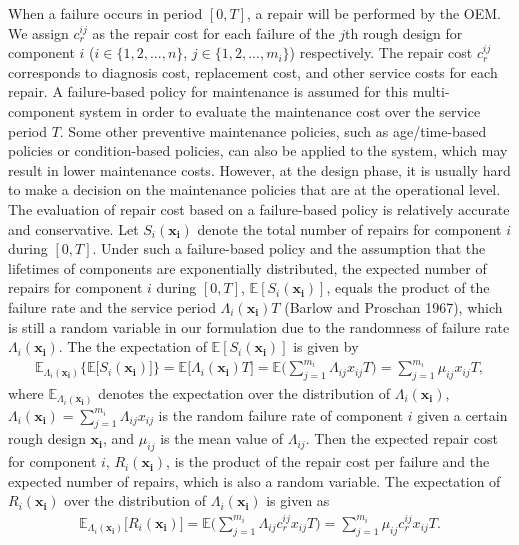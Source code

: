 \documentclass[preprint,12pt]{elsarticle}
\begin{document}
When a failure occurs in period $[0, T]$, a repair will be performed by the OEM. We assign $c_r^{ij}$ as the repair cost for each failure of the $j$th rough design for component $i$ ($i \in \{1,2,...,n\}$, $j \in \{1,2,...,m_i\}$) respectively. The repair cost $c_r^{ij}$ corresponds to diagnosis cost, replacement cost, and other service costs for each repair. A failure-based policy for maintenance is assumed for this multi-component system in order to evaluate the maintenance cost over the service period $T$. Some other preventive maintenance policies, such as age/time-based policies or condition-based policies, can also be applied to the system, which may result in lower maintenance costs. However, at the design phase, it is usually hard to make a decision on the maintenance policies that are at the operational level. The evaluation of repair cost based on a failure-based policy is relatively accurate and conservative. Let $S_{i}(\boldsymbol{x_{i}})$ denote the total number of repairs for component $i$ during $[0,T]$. Under such a failure-based policy and the assumption that the lifetimes of components are exponentially distributed, the expected number of repairs for component $i$ during $[0,T]$, $\mathbb{E}[S_{i}(\boldsymbol{x_{i}})]$, equals the product of the failure rate and the service period $\Lambda_i(\boldsymbol{x_{i}}) T$ (Barlow and Proschan 1967), which is still a random variable in our formulation due to the randomness of failure rate $\Lambda_{i}(\boldsymbol{x_{i}})$. The the expectation of $\mathbb{E}[S_{i}(\boldsymbol{x_{i}})]$ is given by
\begin {eqnarray}
\mathbb{E}_{\Lambda_{i}(\boldsymbol{x_{i}})} \bigg\{ \mathbb{E}\bigg[S_{i}(\boldsymbol{x_{i}})\bigg] \bigg\}=\mathbb{E}\bigg[\Lambda_{i}(\boldsymbol{x_{i}})T\bigg] =\mathbb{E}\bigg(\sum_{j=1}^{m_{i}}{\Lambda_{ij}x_{ij}}T\bigg)=\sum_{j=1}^{m_{i}}{\mu_{ij}x_{ij}}T,
\end {eqnarray}
where $\mathbb{E}_{\Lambda_{i}(\boldsymbol{x_{i}})}$ denotes the expectation over the distribution of $\Lambda_{i}(\boldsymbol{x_{i}})$, $\Lambda_{i}(\boldsymbol{x_{i}})=\sum_{j=1}^{m_{i}}{\Lambda_{ij}x_{ij}}$ is the random failure rate of component $i$ given a certain rough design $\boldsymbol{x_i}$, and $\mu_{ij}$ is the mean value of $\Lambda_{ij}$. Then the expected repair cost for component $i$, $R_{i}(\boldsymbol{x_{i}})$, is the product of the repair cost per failure and the expected number of repairs, which is also a random variable. The expectation of $R_{i}(\boldsymbol{x_{i}})$ over the distribution of $\Lambda_i(\boldsymbol{x_{i}})$ is given as
\begin {eqnarray}
\mathbb{E}_{\Lambda_{i}(\boldsymbol{x_{i}})} \bigg[ R_{i}(\boldsymbol{x_{i}}) \bigg]=\mathbb{E}\bigg(\sum_{j=1}^{m_{i}}{\Lambda_{ij}c_r^{ij}x_{ij}}T\bigg)= \sum_{j=1}^{m_{i}}{\mu_{ij}c_r^{ij}x_{ij}}T. \label{ERi}
\end {eqnarray}
\end{document}
